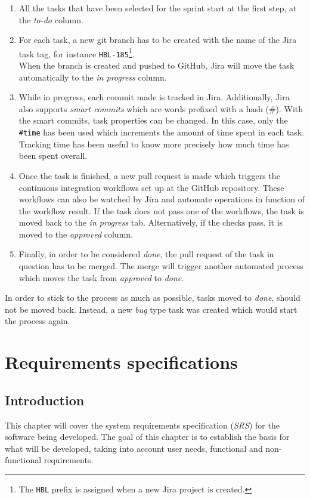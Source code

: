 \documentclass[a4paper, 12pt, oneside]{book}
\begin{document}
\begin{enumerate}
	\item All the tasks that have been selected for the sprint start at the first step, at the \emph{to-do} column.
	\item For each task, a new git branch has to be created with the name of the Jira task tag, for instance \texttt{HBL-185}\footnote{The \texttt{HBL} prefix is assigned when a new Jira project is created.}.
	      \\
	      When the branch is created and pushed to GitHub, Jira will move the task automatically to the \emph{in progress} column.
	\item While in progress, each commit made is tracked in Jira. Additionally, Jira also supports \emph{smart commits} which are words prefixed with a hash (\#). With the smart commits, task properties can be changed. In this case, only the \texttt{\#time} has been used which increments the amount of time spent in each task. Tracking time has been useful to know more precisely how much time has been spent overall.
	\item Once the task is finished, a new pull request is made which triggers the continuous integration workflows set up at the GitHub repository. These workflows can also be watched by Jira and automate operations in function of the workflow result. If the task does not pass one of the workflows, the task is moved back to the \emph{in progress} tab. Alternatively, if the checks pass, it is moved to the \emph{approved} column.
	\item Finally, in order to be considered \emph{done}, the pull request of the task in question has to be merged. The merge will trigger another automated process which moves the task from \emph{approved} to \emph{done}.
\end{enumerate}
In order to stick to the process as much as possible, tasks moved to \emph{done}, should not be moved back. Instead, a new \emph{bug} type task was created which would start the process again.
\chapter{Requirements specifications}
\section{Introduction}
This chapter will cover the system requirements specification (\emph{SRS}) for the software being developed. The goal of this chapter is to establish the basis for what will be developed, taking into account user needs, functional and non-functional requirements.
\end{document}

